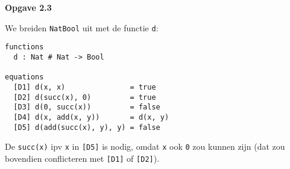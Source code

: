 \documentclass[a4paper,11pt]{article}
\begin{document}
{\bf Opgave 2.3} %

We breiden \verb|NatBool| uit met de functie \verb|d|:

\begin{verbatim}
functions
  d : Nat # Nat -> Bool

equations
  [D1] d(x, x)               = true
  [D2] d(succ(x), 0)         = true
  [D3] d(0, succ(x))         = false
  [D4] d(x, add(x, y))       = d(x, y)
  [D5] d(add(succ(x), y), y) = false
\end{verbatim}

De \verb|succ(x)| ipv \verb|x| in \verb|[D5]| is nodig, omdat \verb|x| ook
\verb|0| zou kunnen zijn (dat zou bovendien conflicteren met \verb|[D1]| of \verb|[D2]|).
\end{document}
